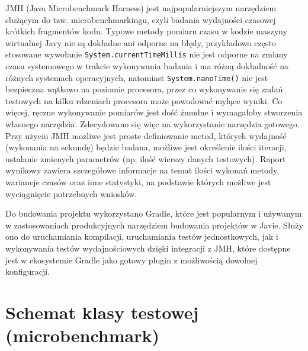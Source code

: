 \documentclass[12pt]{extarticle}
\begin{document}
    JMH (Java Microbenchmark Harness) jest najpopularniejszym narzędziem służącym do tzw. microbenchmarkingu, czyli badania wydajności czasowej krótkich fragmentów kodu. Typowe metody pomiaru czasu w kodzie maszyny wirtualnej Javy nie są dokładne ani odporne na błędy, przykładowo często stosowane wywołanie \texttt{System.currentTimeMillis} nie jest odporne na zmiany czasu systemowego w trakcie wykonywania badania i ma różną dokładność na różnych systemach operacyjnych, natomiast \texttt{System.nanoTime()} nie jest bezpieczna wątkowo na poziomie procesora, przez co wykonywanie się zadań testowych na kilku rdzeniach procesora może powodować mylące wyniki. Co więcej, ręczne wykonywanie pomiarów jest dość żmudne i wymagałoby stworzenia własnego narzędzia. Zdecydowano się więc na wykorzystanie narzędzia gotowego. Przy użyciu JMH możliwe jest proste definiowanie metod, których wydajność (wykonania na sekundę) będzie badana, możliwe jest określenie ilości iteracji, ustalanie zmienych parametrów (np. ilość wierszy danych testowych). Raport wynikowy zawiera szczegółowe informacje na temat ilości wykonań metody, wariancje czasów oraz inne statystyki, na podstawie których możliwe jest wyciągnięcie potrzebnych wniosków.

    Do budowania projektu wykorzystano Gradle, które jest popularnym i używanym w zastosowaniach produkcyjnych narzędziem budowania projektów w Javie. Służy ono do uruchamiania kompilacji, uruchamiania testów jednostkowych, jak i wykonywania testów wydajnościowych dzięki integracji z JMH, które dostępne jest w ekosystemie Gradle jako gotowy plugin z możliwością dowolnej konfiguracji.

\section{Schemat klasy testowej (microbenchmark)}
\end{document}
